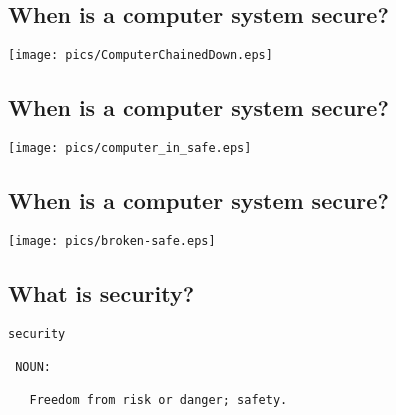 \documentclass[xga]{xdvislides}
\begin{document}
\subsection{When is a computer system secure?}
\vspace*{\fill}
\begin{center}
	\texttt{[image: pics/ComputerChainedDown.eps]}
\end{center}
\vspace*{\fill}

\subsection{When is a computer system secure?}
\vspace*{\fill}
\begin{center}
	\texttt{[image: pics/computer\_in\_safe.eps]}
\end{center}
\vspace*{\fill}

\subsection{When is a computer system secure?}
\vspace*{\fill}
\begin{center}
	\texttt{[image: pics/broken-safe.eps]}
\end{center}
\vspace*{\fill}

%

\subsection{What is security?}
\Huge
\begin{verbatim}
security

 NOUN:

   Freedom from risk or danger; safety.
\end{verbatim}
\Normalsize
\end{document}
